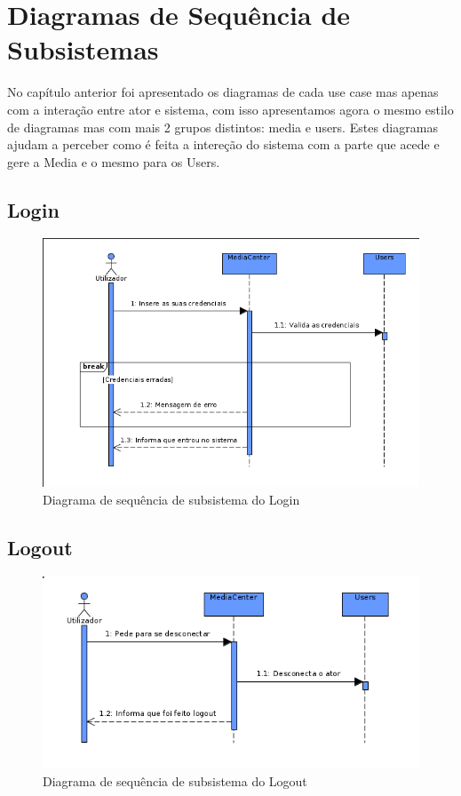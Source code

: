 \documentclass[a4paper]{report}
\begin{document}
\chapter{Diagramas de Sequência de Subsistemas}

No capítulo anterior foi apresentado os diagramas de cada use case mas apenas
com a interação entre ator e sistema, com isso apresentamos agora o mesmo estilo
de diagramas mas com mais 2 grupos distintos: media e users. Estes diagramas
ajudam a perceber como é feita a intereção do sistema com a parte que acede e
gere a Media e o mesmo para os Users.

\section{Login}

\begin{figure}[H]
	\centering 
    \includegraphics[width=\textwidth]{images/loginSub.png}  
    \caption{Diagrama de sequência de subsistema do Login}
\end{figure}

\section{Logout}

\begin{figure}[H]
	\centering 
    \includegraphics[width=\textwidth]{images/logoutSub.png}  
    \caption{Diagrama de sequência de subsistema do Logout}
\end{figure}
\end{document}
